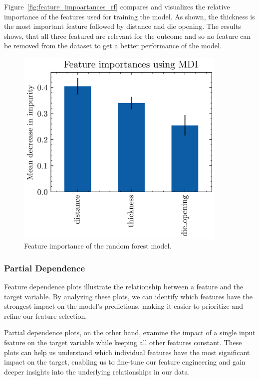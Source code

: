 Figure~\ref{fig:feature_impoartances_rf} compares and visualizes the relative
importance of the features used for training the model.
As shown, the thickness is the most important feature followed by distance
and die opening.
The results shows, that all three featured are relevant for the outcome and so no feature can be
removed from the dataset to get a better performance of the model.

\begin{figure}[H]
    \begin{tcolorbox}[arc=0pt,boxrule=0.5pt]
        \centering
        \includegraphics[width=0.9\textwidth]{chap5/images/rf_feature_importances}
    \end{tcolorbox}
    \caption{Feature importance of the random forest model.}
    \label{fig:feature-importances-rf}
\end{figure}

\subsubsection{Partial Dependence}
Feature dependence plots illustrate the relationship between a feature and the target variable.
By analyzing these plots, we can identify which features have the strongest impact on the model's
predictions, making it easier to prioritize and refine our feature selection.

Partial dependence plots, on the other hand, examine the impact of a single input feature on the
target variable while keeping all other features constant.
These plots can help us understand which individual features have the most significant impact on
the target, enabling us to fine-tune our feature engineering and gain deeper insights into the
underlying relationships in our data.

